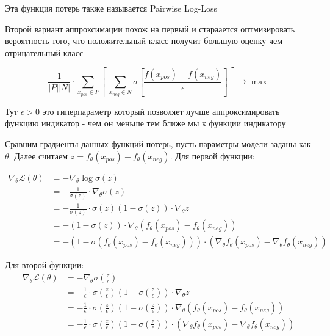 \documentclass{article}
\begin{document}
    Эта функция потерь также называется Pairwise Log-Loss 

    \quad 

    Второй вариант аппроксимации похож на первый и стараается оптмизировать вероятность того, что положительный класс получит
    большую оценку чем отрицательный класс 

    \begin{equation}
        \frac{1}{|P| |N|}  \cdot \sum_{x_{pos} \in P} [ \ \sum_{x_{neg} \in N} \sigma[\frac{f(x_{pos}) - f(x_{neg})}{\epsilon}] \ ] \rightarrow \max
    \end{equation}

    Тут $\epsilon > 0$ это гиперпараметр который позволяет лучше аппроксимировать функцию индикатор - чем он меньше
    тем ближе мы к функции индикатору

    \quad 

    Сравним градиенты данных функций потерь, пусть параметры модели заданы как $\theta$.
    Далее считаем $z = f_\theta(x_{pos}) - f_\theta(x_{neg})$.
    Для первой функции:

    $$
    \begin{aligned}
    \nabla_\theta \mathcal{L}(\theta) &= -\nabla_\theta \log \sigma(z) \\
    &= -\frac{1}{\sigma(z)} \cdot \nabla_\theta \sigma(z) \\
    &= -\frac{1}{\sigma(z)} \cdot \sigma(z)(1 - \sigma(z)) \cdot \nabla_\theta z \\
    &= -(1 - \sigma(z)) \cdot \nabla_\theta (f_\theta(x_{pos}) - f_\theta(x_{neg})) \\
    &= -(1 - \sigma(f_\theta(x_{pos}) - f_\theta(x_{neg}))) \cdot (\nabla_\theta f_\theta(x_{pos}) - \nabla_\theta f_\theta(x_{neg}))
    \end{aligned}
    $$


    Для второй функции:
    $$
    \begin{aligned}
    \nabla_\theta \mathcal{L}(\theta) &= -\nabla_\theta \sigma(\frac{z}{\epsilon}) \\
    &= - \frac{1}{\epsilon} \cdot \sigma(\frac{z}{\epsilon})(1 - \sigma(\frac{z}{\epsilon})) \cdot \nabla_\theta z \\
    &= - \frac{1}{\epsilon} \cdot \sigma(\frac{z}{\epsilon})(1 - \sigma(\frac{z}{\epsilon})) \cdot \nabla_\theta (f_\theta(x_{pos}) - f_\theta(x_{neg})) \\
    &= - \frac{1}{\epsilon} \cdot \sigma(\frac{z}{\epsilon})(1 - \sigma(\frac{z}{\epsilon})) \cdot (\nabla_\theta f_\theta(x_{pos}) - \nabla_\theta f_\theta(x_{neg}))
    \end{aligned}
    $$
\end{document}
